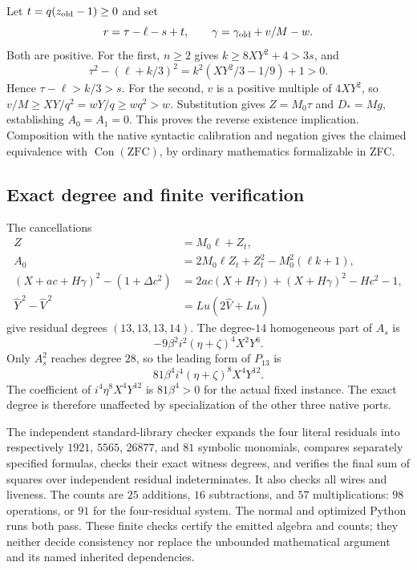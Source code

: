Let $t=q(z_{\rm old}-1)\ge0$ and set
\[
 r=\tau-\ell-s+t,\qquad
 \gamma=\gamma_{\rm old}+v/M-w.
\]
Both are positive.  For the first, $n\ge2$ gives
$k\ge8XY^2+4>3s$, and
\[
 \tau^2-(\ell+k/3)^2
 =k^2(XY^2/3-1/9)+1>0.
\]
Hence $\tau-\ell>k/3>s$.  For the second,
$v$ is a positive multiple of $4XY^2$, so
$v/M\ge XY/q^2=wY/q\ge wq^2>w$.
Substitution gives $Z=M_0\tau$ and $D_*=Mg$, establishing $A_0=A_1=0$.
This proves the reverse existence implication.  Composition with the
native syntactic calibration and negation gives the claimed equivalence
with $\operatorname{Con}(\mathrm{ZFC})$, by ordinary mathematics formalizable
in ZFC.

\subsection{Exact degree and finite verification}

The cancellations
\begin{align*}
 Z&=M_0\ell+Z_t,\\
 A_0&=2M_0\ell Z_t+Z_t^2-M_0^2(\ell k+1),\\
 (X+ac+H\gamma)^2-(1+\Delta c^2)
 &=2ac(X+H\gamma)+(X+H\gamma)^2-Hc^2-1,\\
 \widehat Y^{\,2}-\widehat V^{\,2}&=Lu(2\widehat V+Lu)
\end{align*}
give residual degrees $(13,13,13,14)$.  The degree-$14$ homogeneous part
of $A_s$ is
\[
 -9\beta^2i^2(\eta+\zeta)^4X^2Y^6.
\]
Only $A_s^2$ reaches degree $28$, so the leading form of $P_{13}$ is
\[
 \boxed{81\beta^4i^4(\eta+\zeta)^8X^4Y^{12}.}
\]
The coefficient of $i^4\eta^8X^4Y^{12}$ is $81\beta^4>0$ for the actual
fixed instance.  The exact degree is therefore unaffected by specialization
of the other three native ports.

The independent standard-library checker expands the four literal
residuals into respectively $1921$, $5565$, $26877$, and $81$ symbolic
monomials, compares separately specified formulas, checks their exact
witness degrees, and verifies the final sum of squares over independent
residual indeterminates.  It also checks all wires and liveness.  The
counts are $25$ additions, $16$ subtractions, and $57$ multiplications:
$98$ operations, or $91$ for the four-residual system.  The normal and
optimized Python runs both pass.  These finite checks certify the emitted
algebra and counts; they neither decide consistency nor replace the
unbounded mathematical argument and its named inherited dependencies.
